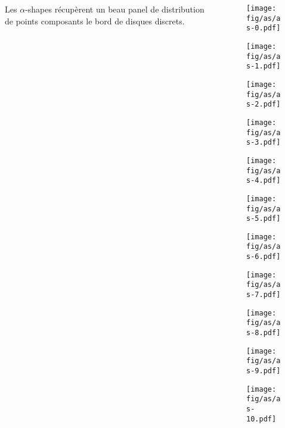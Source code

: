 \begin{frame}
\begin{columns}[t]
\begin{column}{4cm}
      {
        \begin{block}{}
          Les $\alpha$-shapes récupèrent un beau panel de distribution de points composants le bord de disques discrets.
        \end{block}
      }
      
    \end{column}

    \begin{column}{6cm}
      \vspace{-0.8cm}     
      {
        \begin{figure}[h!]
          \centering
          \texttt{[image: fig/as/as-0.pdf]}
        \end{figure}
      }
      {
        \begin{figure}[h!]
          \centering
          \texttt{[image: fig/as/as-1.pdf]}
        \end{figure}
      }
      {
        \begin{figure}[h!]
          \centering
          \texttt{[image: fig/as/as-2.pdf]}
        \end{figure}
      }
      {
        \begin{figure}[h!]
          \centering
          \texttt{[image: fig/as/as-3.pdf]}
        \end{figure}
      }
      {
        \begin{figure}[h!]
          \centering
          \texttt{[image: fig/as/as-4.pdf]}
        \end{figure}
      }
      {
        \begin{figure}[h!]
          \centering
          \texttt{[image: fig/as/as-5.pdf]}
        \end{figure}
      }
      {
        \begin{figure}[h!]
          \centering
          \texttt{[image: fig/as/as-6.pdf]}
        \end{figure}
      }
      {
        \begin{figure}[h!]
          \centering
          \texttt{[image: fig/as/as-7.pdf]}
        \end{figure}
      }
      {
        \begin{figure}[h!]
          \centering
          \texttt{[image: fig/as/as-8.pdf]}
        \end{figure}
      }
      {
        \begin{figure}[h!]
          \centering
          \texttt{[image: fig/as/as-9.pdf]}
        \end{figure}
      }
      {
        \begin{figure}[h!]
          \centering
          \texttt{[image: fig/as/as-10.pdf]}
        \end{figure}
      }


\end{column}
\end{columns}
\end{frame}
